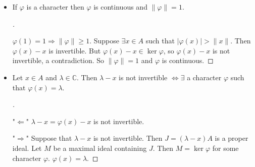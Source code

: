 \documentclass{article}
\theoremstyle{definition}
\newenvironment{proofs}[1][\proofname]{%
  \begin{proof}[#1]$ $\par\nobreak\ignorespaces
}{%
  \end{proof}
}
\newcommand{\CC}{\mathbb C}
\newcommand{\Ra}{\Rightarrow}
\newcommand{\La}{\Leftarrow}
\newcommand{\Lra}{\Leftrightarrow}
\begin{document}
\begin{itemize}
	\item If $\varphi$ is a character then $\varphi$ is continuous and $\|\varphi\| = 1$.

		\begin{proofs}
			$\varphi(1) = 1 \Ra \|\varphi\| \geq 1$.
			Suppose $\exists x \in A$ such that $|\varphi(x)| > \|x\|$.
			Then $\varphi(x) - x$ is invertible.
			But $\varphi(x) - x \in \ker \varphi$, so $\varphi(x) - x$ is not invertible, a contradiction.
			So $\|\varphi\| = 1$ and $\varphi$ is continuous.
		\end{proofs}

	\item Let $x \in A$ and $\lambda \in \CC$.
		Then $\lambda - x$ is not invertible $\Lra \exists$ a character $\varphi$ such that $\varphi(x) = \lambda$.

		\begin{proofs}
			"$\La$" $\lambda - x = \varphi(x) - x$ is not invertible.
			
			\par "$\Ra$" Suppose that $\lambda - x$ is not invertible.
			Then $J = (\lambda - x) A$ is a proper ideal.
			Let $M$ be a maximal ideal containing $J$.
			Then $M = \ker \varphi$ for some character $\varphi$.
			$\varphi(x) = \lambda$.
		\end{proofs}
\end{itemize}
\end{document}
